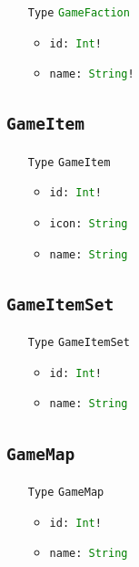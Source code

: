 \documentclass[10pt, a4paper]{memoir}
\numberwithin{equation}{section}
\theoremstyle{plain}
\theoremstyle{defp}
\theoremstyle{dotless}
\theoremstyle{definition}
\theoremstyle{dotless}
\theoremstyle{dotless}
\theoremstyle{defp}
\theoremstyle{defp}
\theoremstyle{be}          %
\theoremstyle{defp}
\newcommand\ttt[1]{\texttt{#1}}
\newcommand\type[1]{\ttt{\textcolor{green}{#1}}}
\begin{document}
\begin{itemize}[noitemsep,topsep=1pt]
\item[\ttt{Type}] \type{GameFaction}
\begin{itemize}[itemsep=1pt,topsep=1pt]
\item \ttt{id: \type{Int}!}
\item \ttt{name: \type{String}!}
\end{itemize}
\end{itemize}

\subsection{\ttt{GameItem}}\label{sec:GameItem}

\begin{itemize}[noitemsep,topsep=1pt]
\item[\ttt{Type}] \ttt{GameItem}
\begin{itemize}[itemsep=1pt,topsep=1pt]
\item \ttt{id: \type{Int}!}
\item \ttt{icon: \type{String}}
\item \ttt{name: \type{String}}
\end{itemize}
\end{itemize}

\subsection{\ttt{GameItemSet}}\label{sec:GameItemSet}

\begin{itemize}[noitemsep,topsep=1pt]
\item[\ttt{Type}] \ttt{GameItemSet}
\begin{itemize}[itemsep=1pt,topsep=1pt]
\item \ttt{id: \type{Int}!}
\item \ttt{name: \type{String}}
\end{itemize}
\end{itemize}

\subsection{\ttt{GameMap}}\label{sec:GameMap}

\begin{itemize}[noitemsep,topsep=1pt]
\item[\ttt{Type}] \ttt{GameMap}
\begin{itemize}[itemsep=1pt,topsep=1pt]
\item \ttt{id: \type{Int}!}
\item \ttt{name: \type{String}}
\end{itemize}
\end{itemize}
\end{document}
